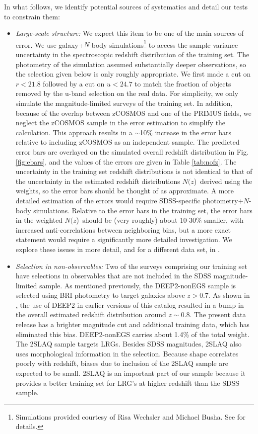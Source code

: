 \documentclass[12pt,preprint]{aastex}
\newcommand{\nofz}{$N(z$)}
\begin{document}
In what follows, we identify potential sources of systematics and detail our
tests to constrain them:

\begin{itemize}

\item {\it Large-scale structure: } We expect this item to be one of the main
sources of error.  We use galaxy+$N$-body simulations\footnote{Simulations
provided courtesy of Risa Wechsler and Michael Busha. See
\cite{bushasimulations} for details.} to access the sample variance uncertainty
in the spectroscopic redshift distribution of the training set.  The photometry
of the simulation assumed substantially deeper observations, so the selection
given below is only roughly appropriate.  We first made a cut on $r<21.8$
followed by a cut on $u<24.7$ to match the fraction of objects removed by the
u-band selection on the real data.  For simplicity, we only simulate the
magnitude-limited surveys of the training set.  In addition, because of the
overlap between zCOSMOS and one of the PRIMUS fields, we neglect the zCOSMOS
sample in the error estimation to simplify the calculation.  This approach
results in a $\sim$10\% increase in the error bars relative to including
zCOSMOS as an independent sample.  The predicted error bars are overlayed on
the simulated overall redshift distribution in Fig.  \ref{fig:ebars}, and the
values of the errors are given in Table \ref{tab:nofz}. The uncertainty in the
training set redshift distributions is not identical to that of the uncertainty
in the estimated redshift distributions \nofz\ derived using the weights, so
the error bars should be thought of as approximate.  A more detailed estimation
of the errors would require SDSS-specific photometry+$N$-body simulations.
Relative to the error bars in the training set, the error bars in the weighted
\nofz\ should be (very roughly) about 10-30\% smaller, with increased
anti-correlations between neighboring bins, but a more exact statement would
require a significantly more detailed investigation.  We explore these issues
in more detail, and for a different data set, in \citet{CunhaPhotozLSS11}.

\item {\it Selection in non-observables: } Two of the surveys comprising our
training set have selections in observables that are not included in the SDSS
magnitude-limited sample.  As mentioned previously, the DEEP2-nonEGS sample is
selected using BRI photometry to target galaxies above $z>0.7$.  As shown in
\citet{CunhaPhotoz09}, the use of DEEP2 in earlier versions of this catalog
resulted in a bump in the overall estimated redshift distribution around $z\sim
0.8$.  The present data release has a brighter magnitude cut and additional
training data, which has eliminated this bias.  
DEEP2-nonEGS carries about 1.4\% of the total weight.  The 2SLAQ sample targets
LRGs.  Besides SDSS magnitudes, 2SLAQ also uses morphological information in the
selection.  Because shape correlates poorly with redshift, biases due to inclusion of the
2SLAQ sample are expected to be small.  2SLAQ is an important part of our
sample because it provides a better training set for LRG's at higher redshift
than the SDSS sample.


\end{itemize}
\end{document}
